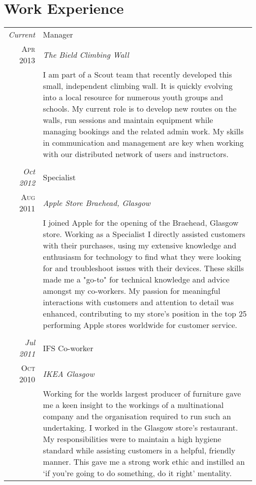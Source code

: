 \documentclass[a4paper,10pt]{article}
\begin{document}
\section{Work Experience}
\begin{tabular}{r|p{11cm}}
 \emph{Current} & Manager \\\textsc{Apr 2013}&\emph{The Bield Climbing Wall}\\&\footnotesize{I am part of a Scout team that recently developed this small, independent climbing wall. It is quickly evolving into a local resource for numerous youth groups and schools. My current role is to develop new routes on the walls, run sessions and maintain equipment while managing bookings and the related admin work. My skills in communication and management are key when working with our distributed network of users and instructors.}\\\multicolumn{2}{c}{} \\
 \emph{Oct 2012} & Specialist \\\textsc{Aug 2011}&\emph{Apple Store Braehead, Glasgow}\\&\footnotesize{I joined Apple for the opening of the Braehead, Glasgow store. Working as a Specialist I directly assisted customers with their purchases, using my extensive knowledge and enthusiasm for technology to find what they were looking for and troubleshoot issues with their devices. These skills made me a "go-to" for technical knowledge and advice amongst my co-workers. My passion for meaningful interactions with customers and attention to detail was enhanced, contributing to my store's position in the top 25 performing Apple stores worldwide for customer service.}\\\multicolumn{2}{c}{} \\
\emph{Jul 2011} & IFS Co-worker \\\textsc{Oct 2010}&\emph{IKEA Glasgow}\\&\footnotesize{Working for the worlds largest producer of furniture gave me a keen insight to the workings of a multinational company and the organisation required to run such an undertaking. I worked in the Glasgow store’s restaurant. My responsibilities were to maintain a high hygiene standard while assisting customers in a helpful, friendly manner. This gave me a strong work ethic and instilled an ‘if you’re going to do something, do it right’ mentality.}
\end{tabular}

\end{document}
